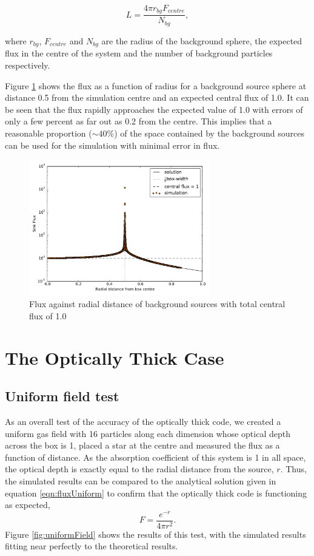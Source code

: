 \begin{equation}
    L = \frac{4\pi r_{bg} F_{centre}}{N_{bg}},
\end{equation}

where $r_{bg}$, $F_{centre}$ and $N_{bg}$ are the radius of the background sphere, the expected flux in the centre of the system and the number of background particles respectively. 

Figure \ref{Fig:bgSource} shows the flux as a function of radius for a background source sphere at distance 0.5 from the simulation centre and an expected central flux of 1.0. It can be seen that the flux rapidly approaches the expected value of 1.0 with errors of only a few percent as far out as 0.2 from the centre. This implies that a reasonable proportion ($\sim 40 \%$) of the space contained by the background sources can be used for the simulation with minimal error in flux.

\begin{figure} [H]
    \centering
    \includegraphics[width=0.7\textwidth]{plots/CH4/resultsCha.pdf}
    \caption{Flux against radial distance of background sources with total central flux of 1.0}
    \label{Fig:bgSource}
\end{figure}
    
\section{The Optically Thick Case}

\subsection{Uniform field test}
As an overall test of the accuracy of the optically thick code, we created a uniform gas field with 16 particles along each dimension whose optical depth across the box is 1, placed a star at the centre and measured the flux as a function of distance. As the absorption coefficient of this system is 1 in all space, the optical depth is exactly equal to the radial distance from the source, $r$. Thus, the simulated results can be compared to the analytical solution given in equation \ref{eqn:fluxUniform} to confirm that the optically thick code is functioning as expected,
\begin{equation}
    F = \frac{e^{-r}}{4\pi r^2}.
    \label{eqn:fluxUniform}
\end{equation}
Figure \ref{fig:uniformField} shows the results of this test, with the simulated results fitting near perfectly to the theoretical results.

